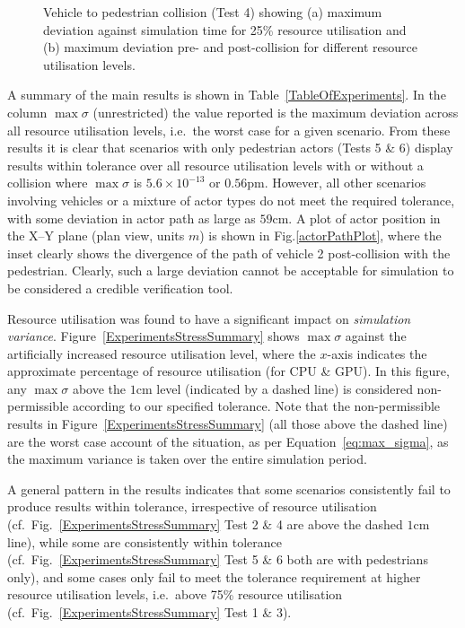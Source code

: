 \begin{figure}[h]
\begin{subfigure}{.49\textwidth}
        \caption{}
        \label{CarsPeopleCollisionPrePost}
    \end{subfigure}
    \caption{Vehicle to pedestrian collision (Test 4) showing (a) maximum deviation against simulation time for 25\% resource utilisation and (b) maximum deviation pre- and post-collision for different resource utilisation levels.}
\end{figure}

A summary of the main results is shown in Table~\ref{TableOfExperiments}.  In the column $\max\sigma$ (unrestricted) the value reported is the maximum deviation across all resource utilisation levels, i.e.\ the worst case for a given scenario. From these results it is clear that scenarios with only pedestrian actors (Tests 5 \& 6) display results within tolerance over all resource utilisation levels with or without a collision where $\max\sigma$ is $5.6\times10^{-13}$ or $0.56\si{\pico\metre}$. However, all other scenarios involving vehicles or a mixture of actor types do not meet the required tolerance, with some deviation in actor path as large as $59$cm. 
%
A plot of actor position in the X--Y plane (plan view, units $m$) is shown in Fig.\ref{actorPathPlot}, where the inset clearly shows the divergence of the path of vehicle 2 post-collision with the pedestrian.
%
Clearly, such a large deviation cannot be acceptable for simulation to be considered a credible verification tool.

Resource utilisation was found to have a significant impact on \textit{simulation variance}. Figure~\ref{ExperimentsStressSummary} shows $\max\sigma$ against the artificially increased resource utilisation level, where the $x$-axis indicates the approximate percentage of resource utilisation (for CPU \& GPU). In this figure, any $\max\sigma$ above the $1$cm level (indicated by a dashed line) is considered non-permissible according to our specified tolerance. Note that the non-permissible results in Figure~\ref{ExperimentsStressSummary} (all those above the dashed line) are the worst case account of the situation, as per Equation~\ref{eq:max_sigma}, as the maximum variance is taken over the entire simulation period.

A general pattern in the results indicates that some scenarios consistently fail to produce results within tolerance, irrespective of resource utilisation (cf.\ Fig.~\ref{ExperimentsStressSummary} Test 2 \& 4 are above the dashed $1$cm line), while some are consistently within tolerance (cf.\ Fig.~\ref{ExperimentsStressSummary} Test 5 \& 6 both are with pedestrians only), and some cases only fail to meet the tolerance requirement at higher resource utilisation levels, i.e.\ above 75\% resource utilisation (cf.\ Fig.~\ref{ExperimentsStressSummary} Test 1 \& 3). 

